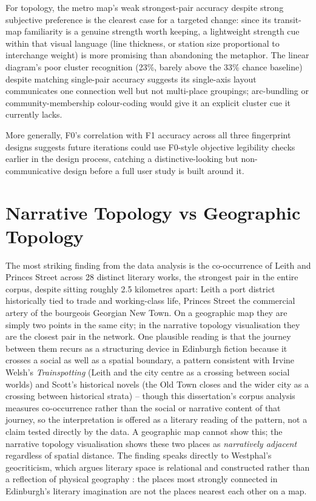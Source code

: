 \documentclass[logo,msc]{infthesis}
\begin{document}
For topology, the metro map's weak strongest-pair accuracy despite strong subjective preference is the clearest case for a targeted change: since its transit-map familiarity is a genuine strength worth keeping, a lightweight strength cue within that visual language (line thickness, or station size proportional to interchange weight) is more promising than abandoning the metaphor. The linear diagram's poor cluster recognition (23\%, barely above the 33\% chance baseline) despite matching single-pair accuracy suggests its single-axis layout communicates one connection well but not multi-place groupings; arc-bundling or community-membership colour-coding would give it an explicit cluster cue it currently lacks.

More generally, F0's correlation with F1 accuracy across all three fingerprint designs suggests future iterations could use F0-style objective legibility checks earlier in the design process, catching a distinctive-looking but non-communicative design before a full user study is built around it.
 
\section{Narrative Topology vs Geographic Topology}
 
The most striking finding from the data analysis is the co-occurrence of Leith and Princes Street across 28 distinct literary works, the strongest pair in the entire corpus, despite sitting roughly 2.5 kilometres apart: Leith a port district historically tied to trade and working-class life, Princes Street the commercial artery of the bourgeois Georgian New Town. On a geographic map they are simply two points in the same city; in the narrative topology visualisation they are the closest pair in the network. One plausible reading is that the journey between them recurs as a structuring device in Edinburgh fiction because it crosses a social as well as a spatial boundary, a pattern consistent with Irvine Welsh's \textit{Trainspotting} (Leith and the city centre as a crossing between social worlds) and Scott's historical novels (the Old Town closes and the wider city as a crossing between historical strata) -- though this dissertation's corpus analysis measures co-occurrence rather than the social or narrative content of that journey, so the interpretation is offered as a literary reading of the pattern, not a claim tested directly by the data. A geographic map cannot show this; the narrative topology visualisation shows these two places as \emph{narratively adjacent} regardless of spatial distance. The finding speaks directly to Westphal's geocriticism, which argues literary space is relational and constructed rather than a reflection of physical geography \cite{westphal2011}: the places most strongly connected in Edinburgh's literary imagination are not the places nearest each other on a map.
\end{document}
